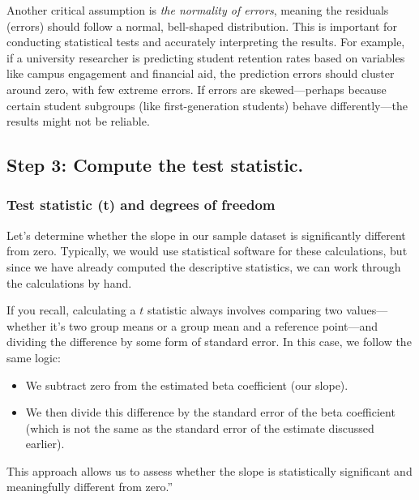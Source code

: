 \documentclass[
  letterpaper,
  DIV=11,
  numbers=noendperiod]{scrreprt}
\begin{document}
Another critical assumption is \emph{the normality of errors}, meaning
the residuals (errors) should follow a normal, bell-shaped distribution.
This is important for conducting statistical tests and accurately
interpreting the results. For example, if a university researcher is
predicting student retention rates based on variables like campus
engagement and financial aid, the prediction errors should cluster
around zero, with few extreme errors. If errors are skewed---perhaps
because certain student subgroups (like first-generation students)
behave differently---the results might not be reliable.

\subsection*{Step 3: Compute the test
statistic.}\label{step-3-compute-the-test-statistic.}

\subsubsection*{Test statistic (t) and degrees of
freedom}\label{test-statistic-t-and-degrees-of-freedom}

Let's determine whether the slope in our sample dataset is significantly
different from zero. Typically, we would use statistical software for
these calculations, but since we have already computed the descriptive
statistics, we can work through the calculations by hand.

If you recall, calculating a \(t\) statistic always involves comparing
two values---whether it's two group means or a group mean and a
reference point---and dividing the difference by some form of standard
error. In this case, we follow the same logic:

\begin{itemize}
\item
  We subtract zero from the estimated beta coefficient (our slope).
\item
  We then divide this difference by the standard error of the beta
  coefficient (which is not the same as the standard error of the
  estimate discussed earlier).
\end{itemize}

This approach allows us to assess whether the slope is statistically
significant and meaningfully different from zero.''
\end{document}
